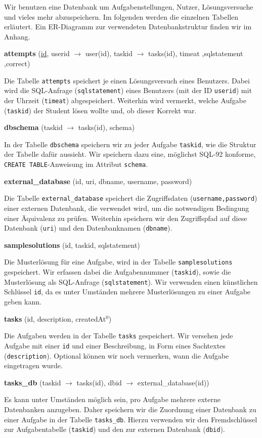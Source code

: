 Wir benutzen eine Datenbank um Aufgabenstellungen, Nutzer, Lösungsversuche und vieles mehr abzuspeichern. Im folgenden werden die einzelnen Tabellen erläutert. Ein ER-Diagramm zur verwendeten Datenbankstruktur finden wir im Anhang. 

\textbf{attempts} (\underline{id}, userid $\to$ user(id), taskid $\to$ tasks(id), timeat ,sqlstatement ,correct)

Die Tabelle \verb|attempts| speichert je einen Lösungsversuch eines Benutzers. Dabei wird die SQL-Anfrage (\verb|sqlstatement|) eines Benutzers (mit der ID \verb|userid|) mit der Uhrzeit (\verb|timeat|) abgespeichert. Weiterhin wird vermerkt, welche Aufgabe (\verb|taskid|) der Student lösen wollte und, ob dieser Korrekt war.

\textbf{dbschema} (taskid $\to$ tasks(id), schema)

In der Tabelle \verb|dbschema| speichern wir zu jeder Aufgabe \verb|taskid|, wie die Struktur der Tabelle dafür aussieht. Wir speichern dazu eine, möglichst SQL-92 konforme, \verb|CREATE TABLE|-Anweisung im Attribut \verb|schema|.

\textbf{external\_database} (id, uri, dbname, username, password)

Die Tabelle \verb|external_database| speichert die Zugriffsdaten (\verb|username,password|) einer externen Datenbank, die verwendet wird, um die notwendigen Bedingung einer Äquivalenz zu prüfen. Weiterhin speichern wir den Zugriffspfad auf diese Datenbank (\verb|uri|) und den Datenbanknamen (\verb|dbname|).

\textbf{samplesolutions} (id, taskid, sqlstatement)

Die Musterlösung für eine Aufgabe, wird in der Tabelle \verb|samplesolutions| gespeichert. Wir erfassen dabei die Aufgabennummer (\verb|taskid|), sowie die Musterlösung als SQL-Anfrage (\verb|sqlstatement|). Wir verwenden einen künstlichen Schlüssel \verb|id|, da es unter Umständen mehrere Musterlösungen zu einer Aufgabe geben kann.

\textbf{tasks} (id, description, createdAt$^0$)

Die Aufgaben werden in der Tabelle \verb|tasks| gespeichert. Wir versehen jede Aufgabe mit einer \verb|id| und einer Beschreibung, in Form eines Sachtextes (\verb|description|). Optional können wir noch vermerken, wann die Aufgabe eingetragen wurde.

\textbf{tasks\_db} (taskid $\to$ tasks(id), dbid $\to$ external\_database(id))

Es kann unter Umständen möglich sein, pro Aufgabe mehrere externe Datenbanken anzugeben. Daher speichern wir die Zuordnung einer Datenbank zu einer Aufgabe in der Tabelle \verb|tasks_db|. Hierzu verwenden wir den Fremdschlüssel zur Aufgabentabelle (\verb|taskid|) und den zur externen Datenbank (\verb|dbid|).


